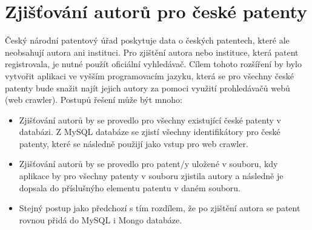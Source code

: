 \section{Zjišťování autorů pro české patenty}
Český národní patentový úřad poskytuje data o českých patentech, které ale neobsahují autora ani instituci. Pro zjištění autora nebo instituce, která patent registrovala, je nutné použít oficiální vyhledávač. Cílem tohoto rozšíření by bylo vytvořit aplikaci ve vyšším programovacím jazyku, která se pro všechny české patenty bude snažit najít jejich autory za pomoci využití prohledávačů webů (web crawler). Postupů řešení může být mnoho:
\begin{itemize}
\item Zjišťování autorů by se provedlo pro všechny existující české patenty v databázi. Z MySQL databáze se zjistí všechny identifikátory pro české patenty, které se následně použijí jako vstup pro web crawler.
\item Zjišťování autorů by se provedlo pro patent/y uložené v souboru, kdy aplikace by pro všechny patenty v souboru zjistila autory a následně je dopsala do příslušnýho elementu patentu v daném souboru.
\item Stejný postup jako předchozí s tím rozdílem, že po zjištění autora se patent rovnou přidá do MySQL i Mongo databáze.
\end{itemize}

